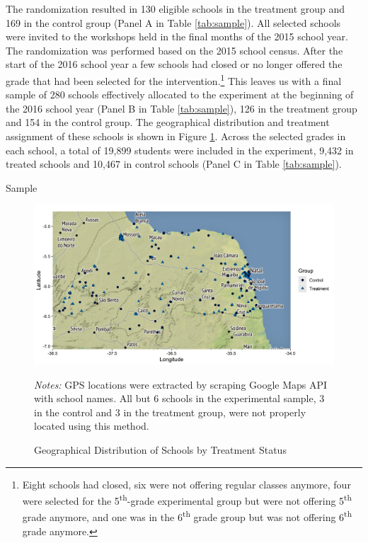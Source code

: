 \documentclass[11pt,a4paper]{article}
\begin{document}
The randomization resulted in 130 eligible schools in the treatment group and 169 in the control group (Panel A in Table \ref{tab:sample}). All selected schools were invited to the workshops held in the final months of the 2015 school year. The randomization was performed based on the 2015 school census. After the start of the 2016 school year a few schools had closed or no longer offered the grade that had been selected for the intervention.\footnote{Eight schools had closed, six were not offering regular classes anymore, four were selected for the 5\textsuperscript{th}-grade experimental group but were not offering 5\textsuperscript{th} grade anymore, and one was in the 6\textsuperscript{th} grade group but was not offering 6\textsuperscript{th} grade anymore.} This leaves us with a final sample of 280 schools effectively allocated to the experiment at the beginning of the 2016 school year (Panel B in Table \ref{tab:sample}), 126 in the treatment group and 154 in the control group. The geographical distribution and treatment assignment of these schools is shown in Figure \ref{fig:treat_map}. Across the selected grades in each school, a total of 19,899 students were included in the experiment, 9,432 in treated schools and 10,467 in control schools (Panel C in Table \ref{tab:sample}).  

\vspace{15pt}

\begin{table}[ht!]
    \caption{Sample}
    \label{tab:sample}
    \centering
    
\end{table}
%

\begin{figure}[ht!]
    \caption{Geographical Distribution of Schools by Treatment Status}
    \label{fig:treat_map}
    \centering
    
    \includegraphics[width=15cm]{DataWork/Output/Figures/fig4-treat_map.png}
    
    \begin{minipage}{0.92\textwidth}
        \small{\textit{Notes:} GPS locations were extracted by scraping Google Maps API with school names. All but 6 schools in the experimental sample, 3 in the control and 3 in the treatment group, were not properly located using this method.}
    \end{minipage}
\end{figure}
\FloatBarrier
\end{document}
